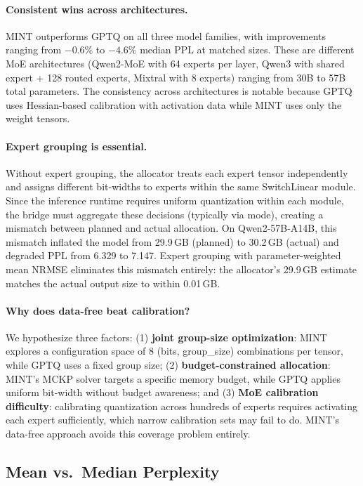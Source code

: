 \documentclass{article}
\begin{document}
\paragraph{Consistent wins across architectures.} MINT outperforms GPTQ on all three model families, with improvements ranging from $-0.6\%$ to $-4.6\%$ median PPL at matched sizes. These are different MoE architectures (Qwen2-MoE with 64 experts per layer, Qwen3 with shared expert + 128 routed experts, Mixtral with 8 experts) ranging from 30B to 57B total parameters. The consistency across architectures is notable because GPTQ uses Hessian-based calibration with activation data while MINT uses only the weight tensors.

\paragraph{Expert grouping is essential.} Without expert grouping, the allocator treats each expert tensor independently and assigns different bit-widths to experts within the same SwitchLinear module. Since the inference runtime requires uniform quantization within each module, the bridge must aggregate these decisions (typically via mode), creating a mismatch between planned and actual allocation. On Qwen2-57B-A14B, this mismatch inflated the model from 29.9\,GB (planned) to 30.2\,GB (actual) and degraded PPL from 6.329 to 7.147. Expert grouping with parameter-weighted mean NRMSE eliminates this mismatch entirely: the allocator's 29.9\,GB estimate matches the actual output size to within 0.01\,GB.

\paragraph{Why does data-free beat calibration?} We hypothesize three factors: (1) \textbf{joint group-size optimization}: MINT explores a configuration space of 8 (bits, group\_size) combinations per tensor, while GPTQ uses a fixed group size; (2) \textbf{budget-constrained allocation}: MINT's MCKP solver targets a specific memory budget, while GPTQ applies uniform bit-width without budget awareness; and (3) \textbf{MoE calibration difficulty}: calibrating quantization across hundreds of experts requires activating each expert sufficiently, which narrow calibration sets may fail to do. MINT's data-free approach avoids this coverage problem entirely.

\subsection{Mean vs.\ Median Perplexity}
\label{sec:mean_vs_median}
\end{document}
